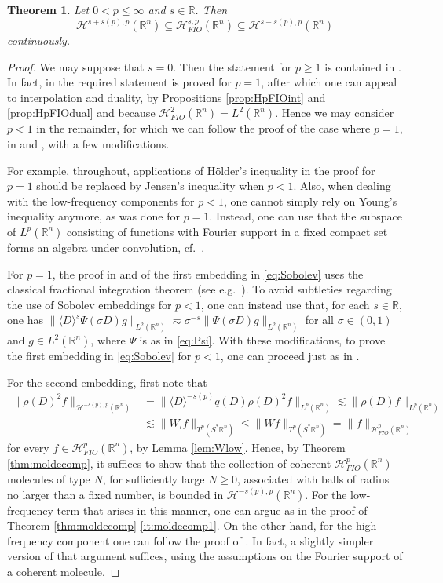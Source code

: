 \documentclass{amsart}
\newcommand {\HT}{\mathcal{H}}
\newcommand {\Hp}{\mathcal{H}^{p}_{FIO}(\Rn)}
\newcommand {\Hps}{\mathcal{H}^{s,p}_{FIO}(\Rn)}
\newcommand {\rb}{\rangle}
\newcommand {\lb}{\langle}
\newcommand {\R}{\mathbb R}
\newcommand {\Rn}{\mathbb{R}^{n}}
\newcommand {\Sp}{S^{*}\Rn}
\newtheorem{theorem}{Theorem}[section]
\theoremstyle{definition}
\numberwithin{equation}{section}
\begin{document}
\begin{theorem}\label{thm:Sobolev}
Let $0<p\leq \infty$ and $s\in\R$. Then
\begin{equation}\label{eq:Sobolev}
\HT^{s+s(p),p}(\Rn)\subseteq\Hps\subseteq\HT^{s-s(p),p}(\Rn)
\end{equation}
continuously.
\end{theorem}
\begin{proof}
We may suppose that $s=0$. Then the statement for $p\geq1$ is contained in \cite[Theorem 7.4]{HaPoRo20}. In fact, in \cite{HaPoRo20} the required statement is proved for $p=1$, after which one can appeal to interpolation and duality, by Propositions \ref{prop:HpFIOint} and \ref{prop:HpFIOdual} and because $\HT^{2}_{FIO}(\Rn)=L^{2}(\Rn)$. Hence we may consider $p<1$ in the remainder, for which we can follow the proof of the case where $p=1$, in \cite[Theorem 4.2]{Smith98a} and \cite[Theorem 7.4] {HaPoRo20}, with a few modifications.

For example, throughout, applications of H\"{o}lder's inequality in the proof for $p=1$ should be replaced by Jensen's inequality when $p<1$. Also, when dealing with the low-frequency components for $p<1$, one cannot simply rely on Young's inequality anymore, as was done for $p=1$. Instead, one can use that the subspace of $L^{p}(\Rn)$ consisting of functions with Fourier support in a fixed compact set forms an algebra under convolution, cf.~\cite[Proposition 1.5.3]{Triebel10}. 
 

For $p=1$, the proof in \cite{Smith98a} and \cite{HaPoRo20} of the first embedding in \eqref{eq:Sobolev} uses the classical fractional integration theorem (see e.g.~\cite[p.~5818]{HaPoRo20}). To avoid subtleties regarding the use of Sobolev embeddings for $p<1$, one can instead use that, for each $s\in\R$, one has $\|\lb D\rb^{s}\Psi(\sigma D)g\|_{L^{2}(\Rn)}\eqsim \sigma^{-s}\|\Psi(\sigma D)g\|_{L^{2}(\Rn)}$ for all $\sigma\in(0,1)$ and $g\in L^{2}(\Rn)$, where $\Psi$ is as in \eqref{eq:Psi}. With these modifications, to prove the first embedding in \eqref{eq:Sobolev} for $p<1$, one can proceed just as in \cite{HaPoRo20}.

For the second embedding, first note that 
\begin{align*}
\|\rho(D)^{2}f\|_{\HT^{-s(p),p}(\Rn)}&=\|\lb D\rb^{-s(p)}q(D)\rho(D)^{2}f\|_{L^{p}(\Rn)}\lesssim \|\rho(D)f\|_{L^{p}(\Rn)}\\
&\lesssim \|W_{l}f\|_{T^{p}(\Sp)}\leq \|Wf\|_{T^{p}(\Sp)}=\|f\|_{\Hp}
\end{align*}
for every $f\in\Hp$, by Lemma \ref{lem:Wlow}. Hence, by Theorem \ref{thm:moldecomp}, it suffices to show that the collection of coherent $\Hp$ molecules of type $N$, for sufficiently large $N\geq0$, associated with balls of radius no larger than a fixed number, is bounded in $\HT^{-s(p),p}(\Rn)$. For the low-frequency term that arises in this manner, one can argue as in the proof of Theorem \ref{thm:moldecomp} \eqref{it:moldecomp1}. On the other hand, for the high-frequency component one can follow the proof of \cite[Lemma 4.3]{Smith98a}. In fact, a slightly simpler version of that argument suffices, using the assumptions on the Fourier support of a coherent molecule.
\end{proof}
\end{document}
